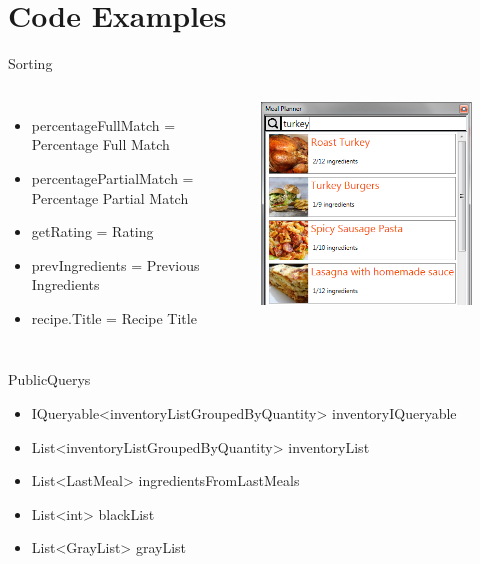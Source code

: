 \section{Code Examples}

\begin{frame}{Sorting}
    \begin{columns}
        \begin{itemize}
            \item percentageFullMatch = Percentage Full Match
            \item percentagePartialMatch = Percentage Partial Match
            \item getRating = Rating
            \item prevIngredients = Previous Ingredients
            \item recipe.Title = Recipe Title
        \end{itemize}
        \begin{figure}
            \centering
            \includegraphics[width=\textwidth]{graphics/recipe-search-item}
        \end{figure}
    \end{columns}

\end{frame}

\begin{frame}{PublicQuerys}
    \begin{itemize}
        \item IQueryable<inventoryListGroupedByQuantity> inventoryIQueryable
        \item List<inventoryListGroupedByQuantity> inventoryList
        \item List<LastMeal> ingredientsFromLastMeals
        \item List<int> blackList
        \item List<GrayList> grayList
    \end{itemize}
\end{frame}

